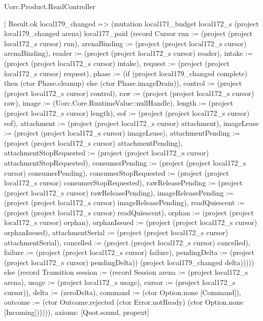 \begin{lexlean}{Uorc.Product.ReadController}
\begin{semanticmodule}
{        | Result.ok local179_changed => (mutation local171_budget local172_s (project local179_changed arena) local177_paid (record Cursor {run := (project (project local172_s cursor) run), arenaBinding := (project (project local172_s cursor) arenaBinding), reader := (project (project local172_s cursor) reader), intake := (project (project local172_s cursor) intake), request := (project (project local172_s cursor) request), phase := (if (project local179_changed complete) then (ctor Phase.cleanup) else (ctor Phase.imageDrain)), control := (project (project local172_s cursor) control), raw := (project (project local172_s cursor) raw), image := (Uorc.Core.RuntimeValue::nullHandle), length := (project (project local172_s cursor) length), eof := (project (project local172_s cursor) eof), attachment := (project (project local172_s cursor) attachment), imageLease := (project (project local172_s cursor) imageLease), attachmentPending := (project (project local172_s cursor) attachmentPending), attachmentStopRequested := (project (project local172_s cursor) attachmentStopRequested), consumerPending := (project (project local172_s cursor) consumerPending), consumerStopRequested := (project (project local172_s cursor) consumerStopRequested), rawReleasePending := (project (project local172_s cursor) rawReleasePending), imageReleasePending := (project (project local172_s cursor) imageReleasePending), readQuiescent := (project (project local172_s cursor) readQuiescent), orphan := (project (project local172_s cursor) orphan), orphanIssued := (project (project local172_s cursor) orphanIssued), attachmentSerial := (project (project local172_s cursor) attachmentSerial), cancelled := (project (project local172_s cursor) cancelled), failure := (project (project local172_s cursor) failure), pendingDelta := (project (project local172_s cursor) pendingDelta)}) (project local179_changed delta))))) else (record Transition {session := (record Session {arena := (project local172_s arena), usage := (project local172_s usage), cursor := (project local172_s cursor)}), delta := (zeroDelta), command := (ctor Option.none [Command]), outcome := (ctor Outcome.rejected (ctor Error.notReady) (ctor Option.none [Incoming]))}))),
  axioms: [Quot.sound, propext]
}


\end{semanticmodule}
\end{lexlean}
